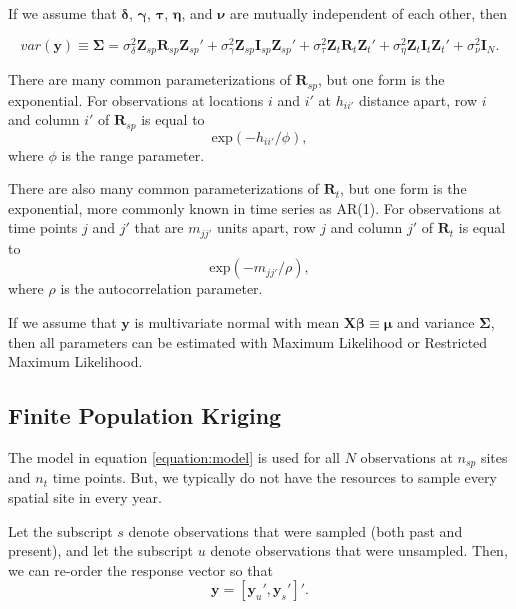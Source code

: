\documentclass[]{interact}
\theoremstyle{plain}%
\theoremstyle{definition}
\theoremstyle{remark}
\begin{document}
If we assume that \(\bm{\delta}\), \(\bm{\gamma}\), \(\bm{\tau}\),
\(\bm{\eta}\), and \(\bm{\nu}\) are mutually independent of each other,
then

\begin{equation}
var(\mathbf{y}) \equiv \bm{\Sigma} = \sigma^2_{\delta} \mathbf{Z}_{sp} \mathbf{R}_{sp} \mathbf{Z}_{sp}' + \sigma^2_{\gamma} \mathbf{Z}_{sp} \mathbf{I}_{sp} \mathbf{Z}_{sp}' + \sigma^2_{\tau} \mathbf{Z}_t \mathbf{R}_t \mathbf{Z}_t'+ \sigma^2_{\eta} \mathbf{Z}_t \mathbf{I}_t \mathbf{Z}_t' + \sigma^2_{\nu} \mathbf{I}_N.
\end{equation}

There are many common parameterizations of \(\mathbf{R}_{sp}\), but one
form is the exponential. For observations at locations \(i\) and \(i'\)
at \(h_{ii'}\) distance apart, row \(i\) and column \(i'\) of
\(\mathbf{R}_{sp}\) is equal to \mbox{} \begin{equation}
\text{exp}(-h_{ii'} / \phi),
\end{equation} \noindent where \(\phi\) is the range parameter.

There are also many common parameterizations of \(\mathbf{R}_t\), but
one form is the exponential, more commonly known in time series as
AR(1). For observations at time points \(j\) and \(j'\) that are
\(m_{jj'}\) units apart, row \(j\) and column \(j'\) of
\(\mathbf{R}_{t}\) is equal to \mbox{} \begin{equation}
\text{exp}(-m_{jj'} / \rho),
\end{equation} \noindent where \(\rho\) is the autocorrelation
parameter.

If we assume that \(\mathbf{y}\) is multivariate normal with mean
\(\mathbf{X} \bm{\beta} \equiv \bm{\mu}\) and variance \(\bm{\Sigma}\),
then all parameters can be estimated with Maximum Likelihood or
Restricted Maximum Likelihood.

\subsection{Finite Population Kriging}

The model in equation \ref{equation:model} is used for all \(N\)
observations at \(n_{sp}\) sites and \(n_t\) time points. But, we
typically do not have the resources to sample every spatial site in
every year.

Let the subscript \(s\) denote observations that were sampled (both past
and present), and let the subscript \(u\) denote observations that were
unsampled. Then, we can re-order the response vector so that \mbox{}
\begin{equation}
\mathbf{y} = [\mathbf{y}_u', \mathbf{y}_s']'.
\end{equation}
\end{document}
